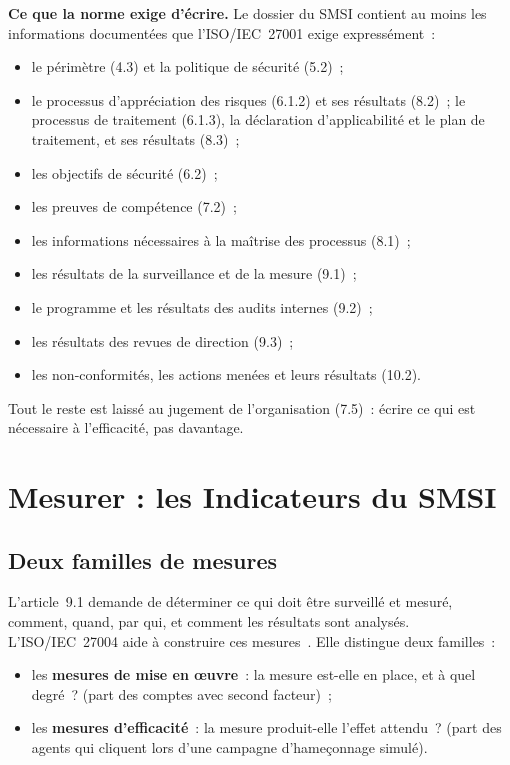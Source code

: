 \begin{boxprocedure}
\textbf{Ce que la norme exige d'écrire.} Le dossier du SMSI contient au
moins les informations documentées que l'ISO/IEC~27001 exige
expressément~:
\begin{itemize}
    \item le périmètre (4.3) et la politique de sécurité (5.2)~;
    \item le processus d'appréciation des risques (6.1.2) et ses résultats
          (8.2)~; le processus de traitement (6.1.3), la déclaration
          d'applicabilité et le plan de traitement, et ses résultats (8.3)~;
    \item les objectifs de sécurité (6.2)~;
    \item les preuves de compétence (7.2)~;
    \item les informations nécessaires à la maîtrise des processus (8.1)~;
    \item les résultats de la surveillance et de la mesure (9.1)~;
    \item le programme et les résultats des audits internes (9.2)~;
    \item les résultats des revues de direction (9.3)~;
    \item les non-conformités, les actions menées et leurs résultats
          (10.2).
\end{itemize}
Tout le reste est laissé au jugement de l'organisation (7.5)~: écrire ce
qui est nécessaire à l'efficacité, pas davantage.
\end{boxprocedure}

\section{Mesurer : les Indicateurs du SMSI}
\label{sec:c11-indicateurs}

\subsection{Deux familles de mesures}

L'article~9.1 demande de déterminer ce qui doit être surveillé et mesuré,
comment, quand, par qui, et comment les résultats sont analysés.
L'ISO/IEC~27004 aide à construire ces mesures~\cite{iso27004_2016}. Elle
distingue deux familles~:
\begin{itemize}
    \item les \textbf{mesures de mise en œuvre}~: la mesure est-elle en
          place, et à quel degré~? (part des comptes avec second facteur)~;
    \item les \textbf{mesures d'efficacité}~: la mesure produit-elle
          l'effet attendu~? (part des agents qui cliquent lors d'une
          campagne d'hameçonnage simulé).
\end{itemize}

